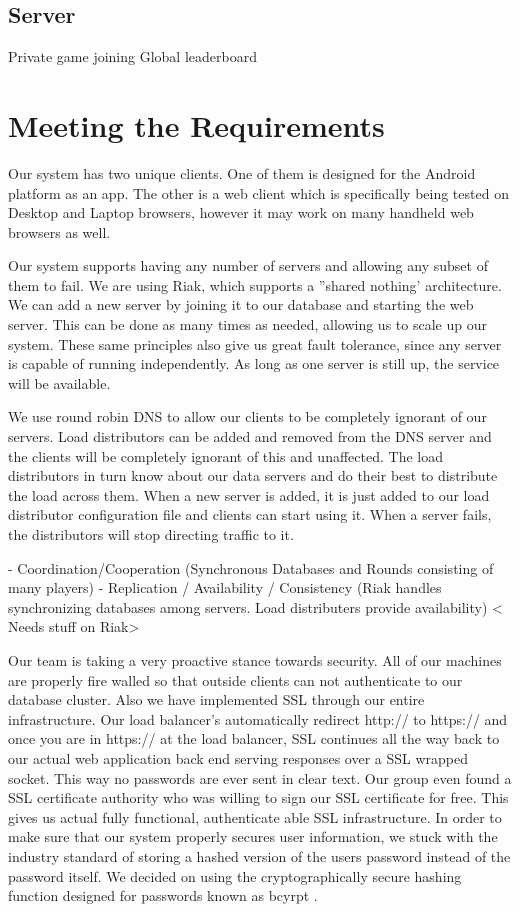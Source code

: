 \documentclass{dependencies/acm_proc_article-sp}
\begin{document}
\subsection {Server}
Private game joining
Global leaderboard

\section {Meeting the Requirements}

Our system has two unique clients. One of them is designed for the Android platform as an app.
The other is a web client which is specifically being tested on Desktop and Laptop
browsers, however it may work on many handheld web browsers as well.

Our system supports having any number of servers and allowing any subset of them to fail.  We are using Riak, which supports a ''shared nothing' architecture.  We can add a new server by joining it to our database and starting the web server.  This can be done as many times as needed, allowing us to scale up our system.  These same principles also give us great fault tolerance, since any server is capable of running independently.  As long as one server is still up, the service will be available.

We use round robin DNS to allow our clients to be completely ignorant of our servers.  Load distributors can be added and removed from the DNS server and the clients will be completely ignorant of this and unaffected.  The load distributors in turn know about our data servers and do their best to distribute the load across them.  When a new server is added, it is just added to our load distributor configuration file and clients can start using it.  When a server fails, the distributors will stop directing traffic to it.


- Coordination/Cooperation (Synchronous Databases and Rounds consisting of many players)
- Replication / Availability / Consistency (Riak handles synchronizing databases among servers. Load distributers provide availability)
  < Needs stuff on Riak>

 Our team is taking a very proactive stance towards security. All of our machines are properly fire walled so that
 outside clients can not authenticate to our database cluster. Also we have implemented SSL through our entire infrastructure.
 Our load balancer's automatically redirect http:// to https:// and once you are in https:// at the load balancer, SSL continues all the
 way back to our actual web application back end serving responses over a SSL wrapped socket. This way no passwords are ever
 sent in clear text. Our group even found a SSL certificate authority who was willing to sign our SSL certificate for free. This gives
 us actual fully functional, authenticate able SSL infrastructure. In order to make sure that our system properly secures user information,
 we stuck with the industry standard of storing a hashed version of the users password instead of the password itself. We decided on using
 the cryptographically secure hashing function designed for passwords known as bcyrpt \cite{bcrypt}.
\end{document}
